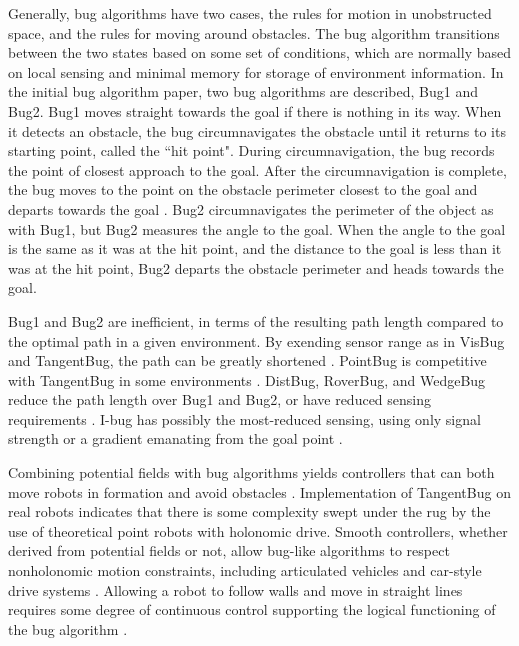 \documentclass[letterpaper, 10 pt, conference]{ieeeconf}  %
\begin{document}
Generally, bug algorithms have two cases, the rules for motion in unobstructed space, and the rules for moving around obstacles. 
The bug algorithm transitions between the two states based on some set of conditions, which are normally based on local sensing and minimal memory for storage of environment information. 
In the initial bug algorithm paper, two bug algorithms are described, Bug1 and Bug2. 
Bug1 moves straight towards the goal if there is nothing in its way. 
When it detects an obstacle, the bug circumnavigates the obstacle until it returns to its starting point, called the ``hit point". 
During circumnavigation, the bug records the point of closest approach to the goal. 
After the circumnavigation is complete, the bug moves to the point on the obstacle perimeter closest to the goal and departs towards the goal \cite{lumelsky1987path}.
Bug2 circumnavigates the perimeter of the object as with Bug1, but Bug2 measures the angle to the goal. 
When the angle to the goal is the same as it was at the hit point, and the distance to the goal is less than it was at the hit point, Bug2 departs the obstacle perimeter and heads towards the goal. 

Bug1 and Bug2 are inefficient, in terms of the resulting path length compared to the optimal path in a given environment. By exending sensor range as in VisBug and TangentBug, the path can be greatly shortened \cite{lumelsky1990incorporating, kamon1996new}.
PointBug is competitive with TangentBug in some environments \cite{buniyamin2011simple}.
DistBug, RoverBug, and WedgeBug reduce the path length over Bug1 and Bug2, or have reduced sensing requirements \cite{kamon1997sensory, volpe2000enhanced}.
I-bug has possibly the most-reduced sensing, using only signal strength or a gradient emanating from the goal point \cite{taylor2009bug}.

Combining potential fields with bug algorithms yields controllers that can both move robots in formation and avoid obstacles \cite{weir2006potbug, mohamed2011improved}. 
Implementation of TangentBug on real robots indicates that there is some complexity swept under the rug by the use of theoretical point robots with holonomic drive.
Smooth controllers, whether derived from potential fields or not, allow bug-like algorithms to respect nonholonomic motion constraints, including articulated vehicles and car-style drive systems \cite{1461311, 6530864, nayl2015autonomous}. 
Allowing a robot to follow walls and move in straight lines requires some degree of continuous control supporting the logical functioning of the bug algorithm \cite{marin2010implementation}.
\end{document}
